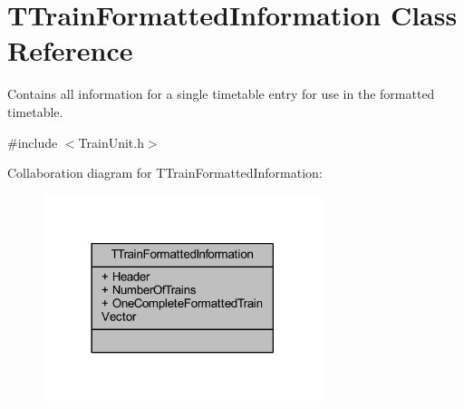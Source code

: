 \hypertarget{class_t_train_formatted_information}{}\section{T\+Train\+Formatted\+Information Class Reference}
\label{class_t_train_formatted_information}


Contains all information for a single timetable entry for use in the formatted timetable.  




{\ttfamily \#include $<$Train\+Unit.\+h$>$}



Collaboration diagram for T\+Train\+Formatted\+Information\+:\nopagebreak
\begin{figure}[H]
\begin{center}
\leavevmode
\includegraphics[width=230pt]{class_t_train_formatted_information__coll__graph}
\end{center}
\end{figure}
